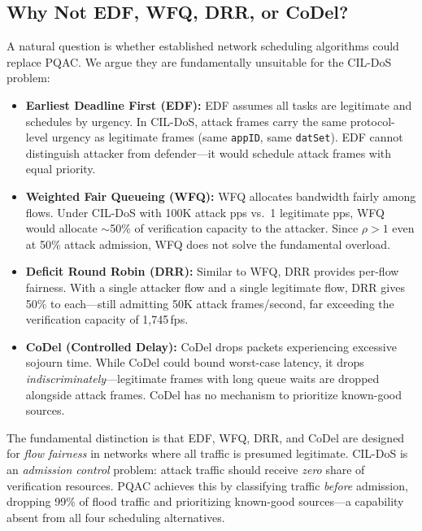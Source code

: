 \documentclass{ieeeaccess}
\begin{document}
\subsection{Why Not EDF, WFQ, DRR, or CoDel?}
A natural question is whether established network scheduling algorithms could replace PQAC. We argue they are fundamentally unsuitable for the CIL-DoS problem:

\begin{itemize}[leftmargin=*]
    \item \textbf{Earliest Deadline First (EDF):} EDF assumes all tasks are legitimate and schedules by urgency. In CIL-DoS, attack frames carry the same protocol-level urgency as legitimate frames (same \texttt{appID}, same \texttt{datSet}). EDF cannot distinguish attacker from defender---it would schedule attack frames with equal priority.
    
    \item \textbf{Weighted Fair Queueing (WFQ):} WFQ allocates bandwidth fairly among flows. Under CIL-DoS with 100K attack pps vs.\ 1 legitimate pps, WFQ would allocate $\sim$50\% of verification capacity to the attacker. Since $\rho > 1$ even at 50\% attack admission, WFQ does not solve the fundamental overload.
    
    \item \textbf{Deficit Round Robin (DRR):} Similar to WFQ, DRR provides per-flow fairness. With a single attacker flow and a single legitimate flow, DRR gives 50\% to each---still admitting 50K attack frames/second, far exceeding the verification capacity of 1,745\,fps.
    
    \item \textbf{CoDel (Controlled Delay):} CoDel drops packets experiencing excessive sojourn time. While CoDel could bound worst-case latency, it drops \emph{indiscriminately}---legitimate frames with long queue waits are dropped alongside attack frames. CoDel has no mechanism to prioritize known-good sources.
\end{itemize}

The fundamental distinction is that EDF, WFQ, DRR, and CoDel are designed for \emph{flow fairness} in networks where all traffic is presumed legitimate. CIL-DoS is an \emph{admission control} problem: attack traffic should receive \emph{zero} share of verification resources. PQAC achieves this by classifying traffic \emph{before} admission, dropping 99\% of flood traffic and prioritizing known-good sources---a capability absent from all four scheduling alternatives.
\end{document}
